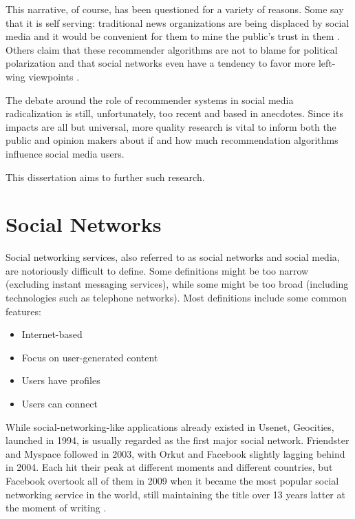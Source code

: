 This narrative, of course, has been questioned for a variety of reasons. Some
say that it is self serving: traditional news organizations are being displaced
by social media and it would be convenient for them to mine the public's trust
in them \citep{munger_right-wing_2020}. Others claim that these recommender
algorithms are not to blame for political polarization and that social networks
even have a tendency to favor more left-wing viewpoints
\citep{ledwich_algorithmic_2019}.

The debate around the role of recommender systems in social media radicalization
is still, unfortunately, too recent and based in anecdotes. Since its impacts
are all but universal, more quality research is vital to inform both the public
and opinion makers about if and how much recommendation algorithms influence
social media users.

This dissertation aims to further such research.

\section{Social Networks}
\label{sec:social_networks}

Social networking services, also referred to as social networks and social
media, are notoriously difficult to define. Some definitions might be too narrow
(excluding instant messaging services), while some might be too broad (including
technologies such as telephone networks). Most definitions \citep{} include some %
common features:

\begin{itemize}
  \item Internet-based
  \item Focus on user-generated content
  \item Users have profiles
  \item Users can connect
\end{itemize}

While social-networking-like applications already existed in Usenet, Geocities,
launched in 1994, is usually regarded as the first major social network.
Friendster and Myspace followed in 2003, with Orkut and Facebook slightly
lagging behind in 2004. Each hit their peak at different moments and different
countries, but Facebook overtook all of them in 2009 when it became the most
popular social networking service in the world, still maintaining the title over
13 years latter at the moment of writing \citep{}. %

